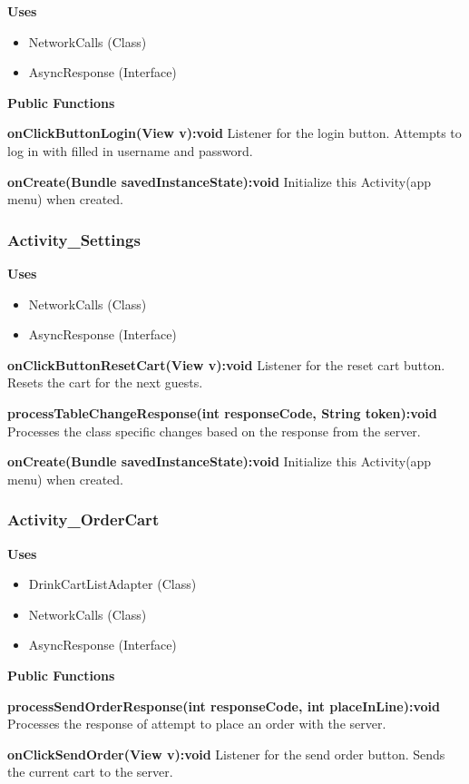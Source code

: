\documentclass [10pt]{article}
\begin{document}
\textbf{Uses}
\begin{itemize}
	\item NetworkCalls (Class)
	\item AsyncResponse (Interface)
\end{itemize}

\textbf{Public Functions}

\textbf{onClickButtonLogin(View v):void}
Listener for the login button. Attempts to log in with filled in username and password.

\textbf{onCreate(Bundle savedInstanceState):void}
Initialize this Activity(app menu) when created.

\subsubsection{Activity\_Settings}

\textbf{Uses}
\begin{itemize}
	\item NetworkCalls (Class)
	\item AsyncResponse (Interface)
\end{itemize}

\textbf{onClickButtonResetCart(View v):void}
Listener for the reset cart button. Resets the cart for the next guests.

\textbf{processTableChangeResponse(int responseCode, String token):void}
Processes the class specific changes based on the response from the server.

\textbf{onCreate(Bundle savedInstanceState):void}
Initialize this Activity(app menu) when created.

\subsubsection{Activity\_OrderCart}

\textbf{Uses}
\begin{itemize}
	\item DrinkCartListAdapter (Class)
	\item NetworkCalls (Class)
	\item AsyncResponse (Interface)
\end{itemize}

\textbf{Public Functions}

\textbf{processSendOrderResponse(int responseCode, int placeInLine):void}
Processes the response of attempt to place an order with the server.

\textbf{onClickSendOrder(View v):void}
Listener for the send order button. Sends the current cart to the server.
\end{document}
